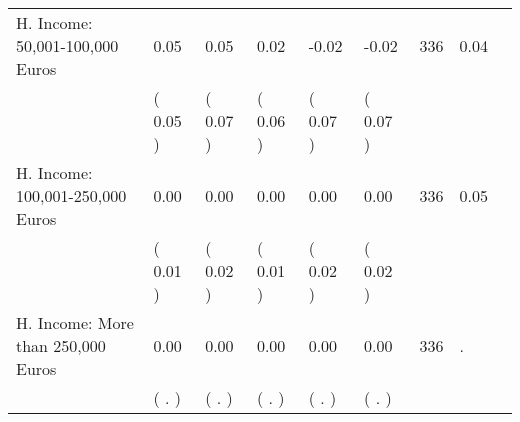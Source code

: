 \begin{tabular}{L{6.2cm} C{1.8cm} C{1.8cm} C{1.8cm} C{1.8cm} C{1.8cm} C{1.8cm} C{0.3cm} C{0.3cm}}
H. Income: 50,001-100,000 Euros &      0.05 &      0.05 &      0.02 &     -0.02 &     -0.02  & 336 &       0.04 \\ 
 & (     0.05 ) & (     0.07 ) & (     0.06 ) & (     0.07 ) & (     0.07 )  & \\
H. Income: 100,001-250,000 Euros &      0.00 &      0.00 &      0.00 &      0.00 &      0.00  & 336 &       0.05 \\ 
 & (     0.01 ) & (     0.02 ) & (     0.01 ) & (     0.02 ) & (     0.02 )  & \\
H. Income: More than 250,000 Euros &      0.00 &      0.00 &      0.00 &      0.00 &      0.00  & 336 &          . \\ 
 & (        . ) & (        . ) & (        . ) & (        . ) & (        . )  & \\
\bottomrule
\end{tabular}
